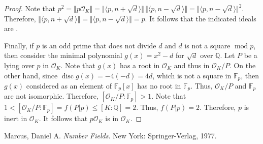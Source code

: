 \documentclass[12pt]{article}
\begin{document}
\begin{proof}
Note that $p^2=\Vert p\mathcal{O}_K \Vert = \Vert \langle p,n+\sqrt{d} \rangle \Vert \, \Vert \langle p,n-\sqrt{d} \rangle \Vert = \Vert \langle p,n-\sqrt{d} \rangle \Vert^2$.  Therefore, $\Vert \langle p,n+\sqrt{d} \rangle \Vert = \Vert \langle p,n-\sqrt{d} \rangle \Vert = p$.  It follows that the indicated ideals are .

Finally, if $p$ is an odd prime that does not divide $d$ and $d$ is not a square $\operatorname{mod} p$, then consider the minimal polynomial $g(x)=x^2-d$ for $\sqrt{d}$ over $\mathbb{Q}$.  Let $P$ be a  lying over $p$ in $\mathcal{O}_K$.  Note that $g(x)$ has a root in $\mathcal{O}_K$ and thus in $\mathcal{O}_K/P$.  On the other hand, since $\operatorname{disc} g(x)=-4(-d)=4d$, which is not a square in $\mathbb{F}_p$, then $g(x)$ considered as an element of $\mathbb{F}_p[x]$ has no root in $\mathbb{F}_p$.  Thus, $\mathcal{O}_K/P$ and $\mathbb{F}_p$ are not isomorphic.  Therefore, $[\mathcal{O}_K/P \!:\! \mathbb{F}_p]>1$.  Note that $1<[\mathcal{O}_K/P \!:\! \mathbb{F}_p]=f(P|p) \le [K \!:\! \mathbb{Q}]=2$.  Thus, $f(P|p)=2$.  Therefore, $p$ is inert in $\mathcal{O}_K$.  It follows that $p\mathcal{O}_K$ is  in $\mathcal{O}_K$.
\end{proof}

\begin{thebibliography}{9}
 Marcus, Daniel A. {\em Number Fields}.  New York: Springer-Verlag, 1977.
\end{thebibliography}
\end{document}
